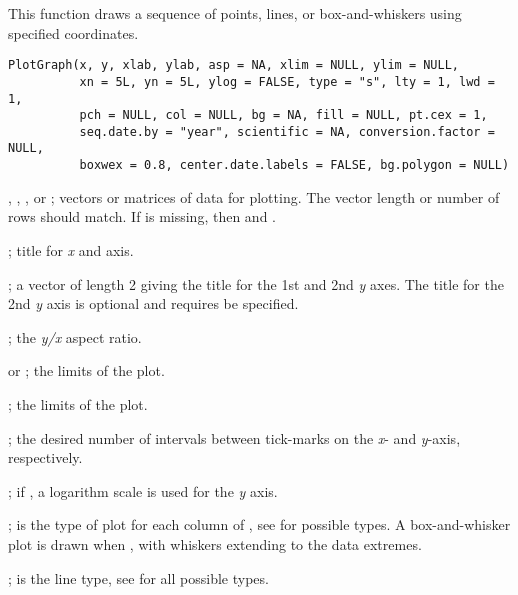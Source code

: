 \documentclass[letterpaper]{book}
\begin{document}
%
\begin{Description}\relax
This function draws a sequence of points, lines, or box-and-whiskers using specified coordinates.
\end{Description}
%
\begin{Usage}
\begin{verbatim}
PlotGraph(x, y, xlab, ylab, asp = NA, xlim = NULL, ylim = NULL,
          xn = 5L, yn = 5L, ylog = FALSE, type = "s", lty = 1, lwd = 1,
          pch = NULL, col = NULL, bg = NA, fill = NULL, pt.cex = 1,
          seq.date.by = "year", scientific = NA, conversion.factor = NULL,
          boxwex = 0.8, center.date.labels = FALSE, bg.polygon = NULL)
\end{verbatim}
\end{Usage}
%
\begin{Arguments}
\begin{ldescription}
\item[\code{x, y}] , , , or ; vectors or matrices of data for plotting.
The vector length or number of rows should match.
If  is missing, then  and .
\item[\code{xlab}] ; title for \emph{x} and axis.
\item[\code{ylab}] ; a vector of length 2 giving the title for the 1st and 2nd \emph{y} axes.
The title for the 2nd \emph{y} axis is optional and requires  be specified.
\item[\code{asp}] ; the \emph{y/x} aspect ratio.
\item[\code{xlim}]  or ; the  limits  of the plot.
\item[\code{ylim}] ; the  limits  of the plot.
\item[\code{xn, yn}] ; the desired number of intervals between tick-marks on the \emph{x}- and \emph{y}-axis, respectively.
\item[\code{ylog}] ; if , a logarithm scale is used for the \emph{y} axis.
\item[\code{type}] ; is the type of plot for each column of , see  for possible types.
A box-and-whisker plot is drawn when , with whiskers extending to the data extremes.
\item[\code{lty}] ; is the line type, see  for all possible types.

\end{ldescription}
\end{Arguments}
\end{document}
